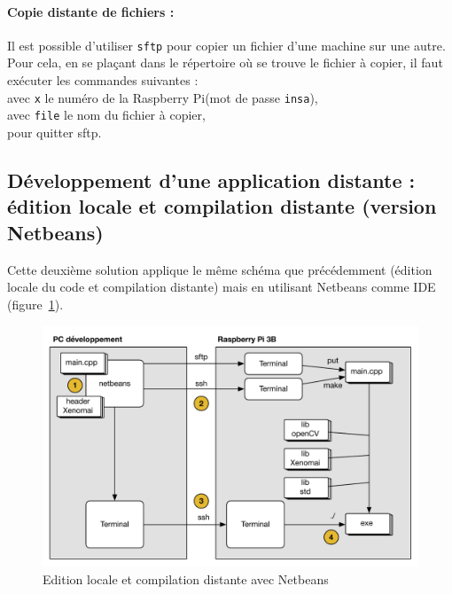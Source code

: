 \documentclass[11pt]{paper}
\newcommand{\raspi}{Raspberry Pi\xspace}
\begin{document}
\paragraph{Copie distante de fichiers :}
Il est possible d'utiliser {\tt sftp} pour copier un fichier d'une machine sur une autre. Pour cela, en se plaçant dans le répertoire où se trouve le fichier à copier, il faut exécuter les commandes suivantes :
\\ \indent{} avec {\tt x} le numéro de la \raspi (mot de passe {\tt insa}),
\\ \indent{} avec {\tt file} le nom du fichier à copier,
\\ \indent{} pour quitter sftp.


\subsection{Développement d'une application distante : édition locale et compilation distante (version Netbeans)}

Cette deuxième solution applique le même schéma que précédemment (édition locale du code et compilation distante) mais en utilisant Netbeans comme IDE (figure~\ref{fig:edition2b}).

\begin{figure}[htbp]
\begin{center}
\includegraphics[scale=0.5]{./figures-pdf/edition2b}
\caption{Edition locale et compilation distante avec Netbeans}
\label{fig:edition2b}
\end{center}
\end{figure}
\end{document}
